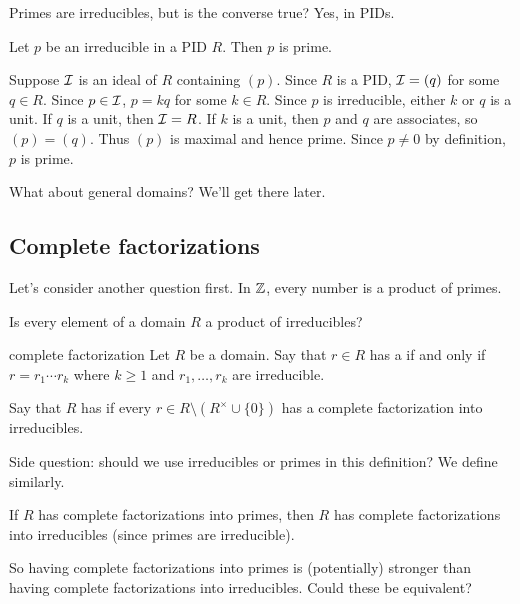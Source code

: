 \documentclass[12pt,letterpaper]{report}
\begin{document}
Primes are irreducibles, but is the converse true?
Yes, in PIDs.

\begin{prop}{}{}
  Let $p$ be an irreducible in a PID $R$.
  Then $p$ is prime.
\end{prop}

\begin{thmproof}
  Suppose $\mathcal{I}$ is an ideal of $R$ containing $(p)$.
  Since $R$ is a PID, $\mathcal{I} = (q)$ for some $q \in R$.
  Since $p \in \mathcal{I}$, $p = kq$ for some $k \in R$.
  Since $p$ is irreducible, either $k$ or $q$ is a unit.
  If $q$ is a unit, then $\mathcal{I} = R$.
  If $k$ is a unit, then $p$ and $q$ are associates, so $(p) = (q)$.
  Thus $(p)$ is maximal and hence prime.
  Since $p \neq 0$ by definition, $p$ is prime.
\end{thmproof}

What about general domains?
We'll get there later.

\pagebreak
\subsection{Complete factorizations}

Let's consider another question first.
In $\mathbb{Z}$, every number is a product of primes.

\begin{tcolorbox}
  Is every element of a domain $R$ a product of irreducibles?
\end{tcolorbox}

\begin{defn}{complete factorization}{}
  Let $R$ be a domain.
  Say that $r \in R$ has a  if and only if
  $r = r_1 \cdots r_k$ where $k \geq 1$ and $r_1, \ldots, r_k$ are irreducible.

  Say that $R$ has  if every
  $r \in R \setminus (R^\times \cup \{0\})$ has a complete factorization into irreducibles.
\end{defn}

Side question: should we use irreducibles or primes in this definition?
We define  similarly.

If $R$ has complete factorizations into primes, then $R$ has complete factorizations into
irreducibles (since primes are irreducible).

So having complete factorizations into primes is (potentially) stronger than having complete
factorizations into irreducibles.
Could these be equivalent?
\end{document}
